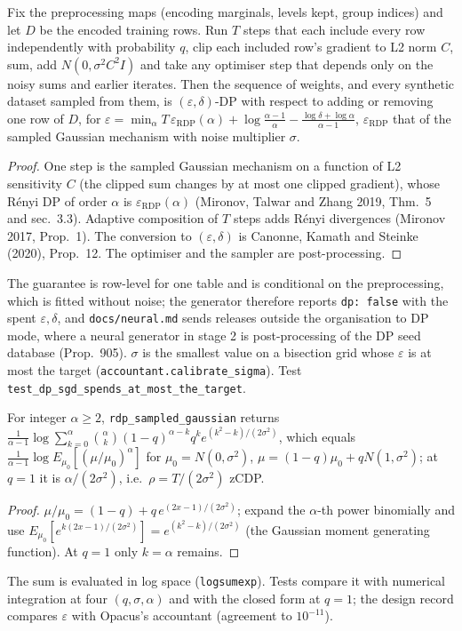 \setcounter{proposition}{1801}
\begin{proposition}\label{prop:nndpsgd}
Fix the preprocessing maps (encoding marginals, levels kept, group indices) and let $D$ be the encoded training rows. Run $T$ steps that each include every row independently with probability $q$, clip each included row's gradient to L2 norm $C$, sum, add $N(0,\sigma^2C^2I)$ and take any optimiser step that depends only on the noisy sums and earlier iterates. Then the sequence of weights, and every synthetic dataset sampled from them, is $(\varepsilon,\delta)$-DP with respect to adding or removing one row of $D$, for $\varepsilon=\min_\alpha T\,\varepsilon_{\mathrm{RDP}}(\alpha)+\log\frac{\alpha-1}{\alpha}-\frac{\log\delta+\log\alpha}{\alpha-1}$, $\varepsilon_{\mathrm{RDP}}$ that of the sampled Gaussian mechanism with noise multiplier $\sigma$.
\end{proposition}
\begin{proof}
One step is the sampled Gaussian mechanism on a function of L2 sensitivity $C$ (the clipped sum changes by at most one clipped gradient), whose R\'enyi DP of order $\alpha$ is $\varepsilon_{\mathrm{RDP}}(\alpha)$ (Mironov, Talwar and Zhang 2019, Thm.~5 and sec.~3.3). Adaptive composition of $T$ steps adds R\'enyi divergences (Mironov 2017, Prop.~1). The conversion to $(\varepsilon,\delta)$ is Canonne, Kamath and Steinke (2020), Prop.~12. The optimiser and the sampler are post-processing.
\end{proof}
\noindent The guarantee is row-level for one table and is conditional on the preprocessing, which is fitted without noise; the generator therefore reports \texttt{dp: false} with the spent $\varepsilon,\delta$, and \texttt{docs/neural.md} sends releases outside the organisation to DP mode, where a neural generator in stage 2 is post-processing of the DP seed database (Prop.~905). $\sigma$ is the smallest value on a bisection grid whose $\varepsilon$ is at most the target (\texttt{accountant.calibrate\_sigma}). Test \texttt{test\_dp\_sgd\_spends\_at\_most\_the\_target}.

\setcounter{proposition}{1802}
\begin{proposition}\label{prop:nnacct}
For integer $\alpha\ge2$, \texttt{rdp\_sampled\_gaussian} returns $\frac{1}{\alpha-1}\log\sum_{k=0}^{\alpha}\binom{\alpha}{k}(1-q)^{\alpha-k}q^k e^{(k^2-k)/(2\sigma^2)}$, which equals $\frac{1}{\alpha-1}\log E_{\mu_0}[(\mu/\mu_0)^\alpha]$ for $\mu_0=N(0,\sigma^2)$, $\mu=(1-q)\mu_0+qN(1,\sigma^2)$; at $q=1$ it is $\alpha/(2\sigma^2)$, i.e.\ $\rho=T/(2\sigma^2)$ zCDP.
\end{proposition}
\begin{proof}
$\mu/\mu_0=(1-q)+q\,e^{(2x-1)/(2\sigma^2)}$; expand the $\alpha$-th power binomially and use $E_{\mu_0}[e^{k(2x-1)/(2\sigma^2)}]=e^{(k^2-k)/(2\sigma^2)}$ (the Gaussian moment generating function). At $q=1$ only $k=\alpha$ remains.
\end{proof}
\noindent The sum is evaluated in log space (\texttt{logsumexp}). Tests compare it with numerical integration at four $(q,\sigma,\alpha)$ and with the closed form at $q=1$; the design record compares $\varepsilon$ with Opacus's accountant (agreement to $10^{-11}$).

